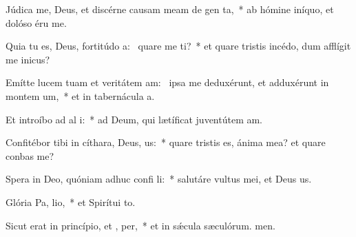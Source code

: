 \item Júdica me, Deus, et discérne causam meam de gen  ta,~* ab hómine iníquo, et dolóso éru me.
\item Quia tu es, Deus, fortitúdo a:~\pscross{} quare me ti?~* et quare tristis incédo, dum afflígit me inicus?
\item Emítte lucem tuam et veritátem am:~\pscross{} ipsa me deduxérunt, et adduxérunt in montem  um,~* et in tabernácula a.
\item Et introíbo ad al i:~* ad Deum, qui lætíficat juventútem am.
\item Confitébor tibi in cíthara, Deus,  us:~* quare tristis es, ánima mea? et quare conbas me?
\item Spera in Deo, quóniam adhuc confi li:~* salutáre vultus mei, et Deus us.
\item Glória Pa,  lio,~* et Spirítui to.
\item Sicut erat in princípio, et ,  per,~* et in sǽcula sæculórum. men.
